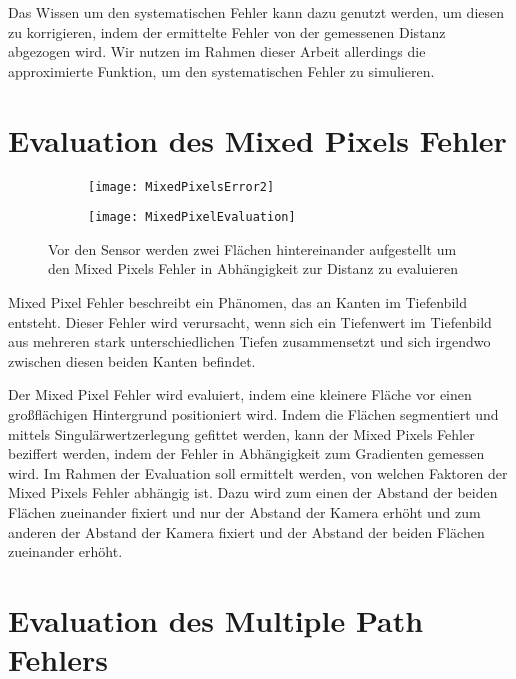 \documentclass[thesis.tex]{subfiles}
\begin{document}
Das Wissen um den systematischen Fehler kann dazu genutzt werden, um diesen zu korrigieren, indem der ermittelte Fehler von der gemessenen Distanz abgezogen wird. Wir nutzen im Rahmen dieser Arbeit allerdings die approximierte Funktion, um den systematischen Fehler zu simulieren.

\newpage

\section{Evaluation des Mixed Pixels Fehler}

\begin{figure}[h]
\centering
\begin{subfigure}{.5\textwidth}
  \centering
  \texttt{[image: MixedPixelsError2]}
\end{subfigure}%
\begin{subfigure}{.5\textwidth}
  \centering
  \texttt{[image: MixedPixelEvaluation]}
\end{subfigure}
\caption{Vor den Sensor werden zwei Flächen hintereinander aufgestellt um den Mixed Pixels Fehler in Abhängigkeit zur Distanz zu evaluieren}
\end{figure}

Mixed Pixel Fehler beschreibt ein Phänomen, das an Kanten im Tiefenbild entsteht. Dieser Fehler wird verursacht, wenn sich ein Tiefenwert im Tiefenbild aus mehreren stark unterschiedlichen Tiefen zusammensetzt und sich irgendwo zwischen diesen beiden Kanten befindet.

Der Mixed Pixel Fehler wird evaluiert, indem eine kleinere Fläche vor einen großflächigen Hintergrund positioniert wird. Indem die Flächen segmentiert und mittels Singulärwertzerlegung gefittet werden, kann der Mixed Pixels Fehler beziffert werden, indem der Fehler in Abhängigkeit zum Gradienten gemessen wird. Im Rahmen der Evaluation soll ermittelt werden, von welchen Faktoren der Mixed Pixels Fehler abhängig ist. Dazu wird zum einen der Abstand der beiden Flächen zueinander fixiert und nur der Abstand der Kamera erhöht und zum anderen der Abstand der Kamera fixiert und der Abstand der beiden Flächen zueinander erhöht.

\newpage

\section{Evaluation des Multiple Path Fehlers}
\end{document}
